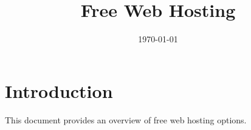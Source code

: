 \documentclass{article}
\title{Free Web Hosting}
\author{}
\date{\today}
\begin{document}
\maketitle

\section{Introduction}

This document provides an overview of free web hosting options.
\end{document}
